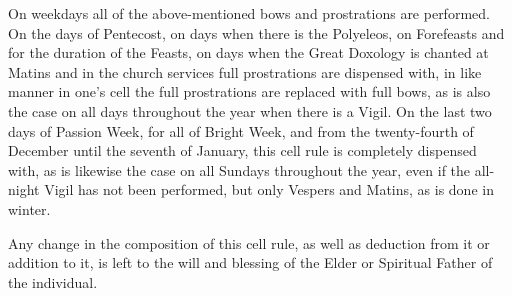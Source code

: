 On weekdays all of the above-mentioned bows and prostrations are performed. On the days of Pentecost, on days when there is the Polyeleos, on Forefeasts and for the duration of the Feasts, on days when the Great Doxology is chanted at Matins and in the church services full prostrations are dispensed with, in like manner in one's cell the full prostrations are replaced with full bows, as is also the case on all days throughout the year when there is a Vigil. On the last two days of Passion Week, for all of Bright Week, and from the twenty-fourth of December until the seventh of January, this cell rule is completely dispensed with, as is likewise the case on all Sundays throughout the year, even if the all-night Vigil has not been performed, but only Vespers and Matins, as is done in winter.

Any change in the composition of this cell rule, as well as deduction from it or addition to it, is left to the will and blessing of the Elder or Spiritual Father of the individual.
